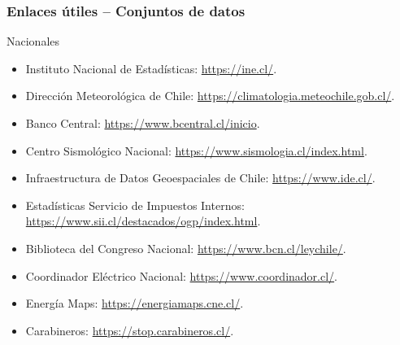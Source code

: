 \documentclass[table]{beamer}
\begin{document}
\begin{frame}
    \frametitle{Enlaces útiles -- Conjuntos de datos}
    \begin{block}{Nacionales}
        \small
        \begin{itemize}
            \item Instituto Nacional de Estadísticas: \url{https://ine.cl/}.
            \item Dirección Meteorológica de Chile: \url{https://climatologia.meteochile.gob.cl/}.
            \item Banco Central: \url{https://www.bcentral.cl/inicio}.
            \item Centro Sismológico Nacional: \url{https://www.sismologia.cl/index.html}.
            \item Infraestructura de Datos Geoespaciales de Chile: \url{https://www.ide.cl/}.
            \item Estadísticas Servicio de Impuestos Internos: \url{https://www.sii.cl/destacados/ogp/index.html}.
            \item Biblioteca del Congreso Nacional: \url{https://www.bcn.cl/leychile/}.
            \item Coordinador Eléctrico Nacional: \url{https://www.coordinador.cl/}.
            \item Energía Maps: \url{https://energiamaps.cne.cl/}.
            \item Carabineros: \url{https://stop.carabineros.cl/}.
        \end{itemize}
    \end{block}
\end{frame}
\end{document}
